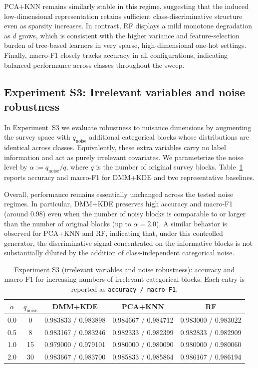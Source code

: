 \documentclass[preprint,11pt]{elsarticle}
\begin{document}
PCA+KNN remains similarly stable in this regime, suggesting that the induced low-dimensional representation retains sufficient
class-discriminative structure even as sparsity increases. In contrast, RF displays a mild monotone degradation as $d$ grows, which is
consistent with the higher variance and feature-selection burden of tree-based learners in very sparse, high-dimensional one-hot settings.
Finally, macro-F1 closely tracks accuracy in all configurations, indicating balanced performance across classes throughout the sweep.


\subsection{Experiment S3: Irrelevant variables and noise robustness}
\label{subsec:exp_s3}

In Experiment~S3 we evaluate robustness to nuisance dimensions by augmenting the survey space with
$q_{\mathrm{noise}}$ additional categorical blocks whose distributions are identical across classes.
Equivalently, these extra variables carry no label information and act as purely irrelevant covariates.
We parameterize the noise level by $\alpha:=q_{\mathrm{noise}}/q$, where $q$ is the number of original survey blocks.
Table~\ref{tab:s3_results_compact} reports accuracy and macro-F1 for DMM+KDE and two representative baselines.

Overall, performance remains essentially unchanged across the tested noise regimes.
In particular, DMM+KDE preserves high accuracy and macro-F1 (around $0.98$) even when the number of noisy blocks is comparable
to or larger than the number of original blocks (up to $\alpha=2.0$). A similar behavior is observed for PCA+KNN and RF, indicating
that, under this controlled generator, the discriminative signal concentrated on the informative blocks is not substantially diluted
by the addition of class-independent categorical noise.

\begin{table}[H]
\centering
\caption{Experiment S3 (irrelevant variables and noise robustness): accuracy and macro-F1 for increasing numbers of irrelevant categorical blocks.
Each entry is reported as \texttt{accuracy / macro-F1}.}
\label{tab:s3_results_compact}
\setlength{\tabcolsep}{6pt}
\renewcommand{\arraystretch}{1.12}
\begin{tabular}{c c c c c}
\toprule
$\alpha$ & $q_{\mathrm{noise}}$ & DMM+KDE & PCA+KNN & RF \\
\midrule
0.0 & 0  & 0.983833 / 0.983898 & 0.984667 / 0.984712 & 0.983000 / 0.983022 \\
0.5 & 8  & 0.983167 / 0.983246 & 0.982333 / 0.982399 & 0.982833 / 0.982909 \\
1.0 & 15 & 0.979000 / 0.979101 & 0.980000 / 0.980090 & 0.980000 / 0.980060 \\
2.0 & 30 & 0.983667 / 0.983700 & 0.985833 / 0.985864 & 0.986167 / 0.986194 \\
\bottomrule
\end{tabular}
\end{table}
\end{document}
